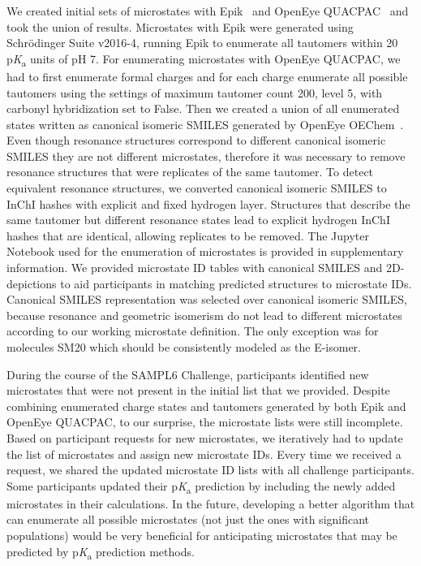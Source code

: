 \documentclass[9pt,lineno,final]{elife}
\newcommand{\pKa}{p\textit{K}\textsubscript{a}}
\begin{document}
We created initial sets of microstates with Epik~\citep{Shelley:2007:J.Comput.AidedMol.Des.} and OpenEye QUACPAC~\citep{quacpac_openeye_2017} and took the union of results. 
Microstates with Epik were generated using Schr\"{o}dinger Suite v2016-4, running Epik to enumerate all tautomers within 20 \pKa{} units of pH 7.
For enumerating microstates with OpenEye QUACPAC, we had to first enumerate formal charges and for each charge enumerate all possible tautomers using the settings of maximum tautomer count 200, level 5, with carbonyl hybridization set to False.
Then we created a union of all enumerated states written as canonical isomeric SMILES generated by OpenEye OEChem~\citep{oechem_openeye_2017}.
Even though resonance structures correspond to different canonical isomeric SMILES they are not different microstates, therefore it was necessary to remove resonance structures that were replicates of the same tautomer. 
To detect equivalent resonance structures, we converted canonical isomeric SMILES to InChI hashes with explicit and fixed hydrogen layer. Structures that describe the same tautomer but different resonance states lead to explicit hydrogen InChI hashes that are identical, allowing replicates to be removed. 
The Jupyter Notebook used for the enumeration of microstates is provided in supplementary information. 
We provided microstate ID tables with canonical SMILES and 2D-depictions to aid participants in matching predicted structures to microstate IDs. 
Canonical SMILES representation was selected over canonical isomeric SMILES, because resonance and geometric isomerism do not lead to different microstates according to our working microstate definition. 
The only exception was for molecules SM20 which should be consistently modeled as the E-isomer.

During the course of the SAMPL6 Challenge, participants identified new microstates that were not present in the initial list that we provided. 
Despite combining enumerated charge states and tautomers generated by both Epik and OpenEye QUACPAC, to our surprise, the microstate lists were still incomplete.
Based on participant requests for new microstates, we iteratively had to update the list of microstates and assign new microstate IDs.
Every time we received a request, we shared the updated microstate ID lists with all challenge participants.
Some participants updated their \pKa{} prediction by including the newly added microstates in their calculations. 
In the future, developing a better algorithm that can enumerate all possible microstates (not just the ones with significant populations) would be very beneficial for anticipating microstates that may be predicted by \pKa{} prediction methods. 
\end{document}
